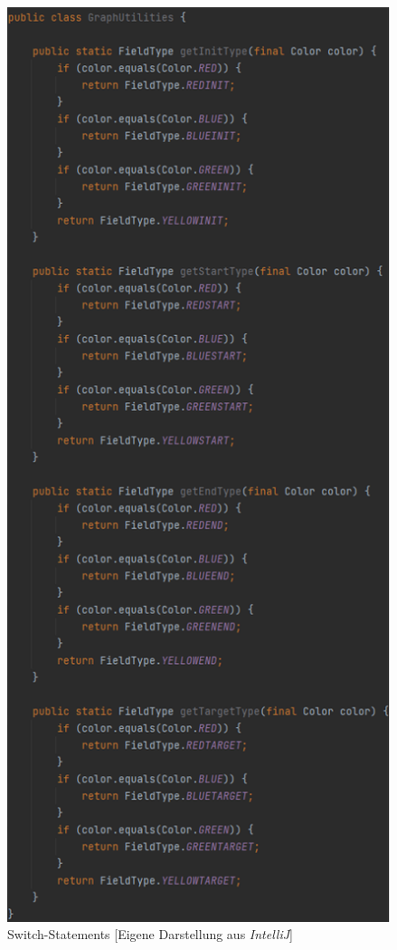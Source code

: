 \begin{figure}[htbp]
\centering
\centerline{\includegraphics[scale=.55]{graphutilities}}
\caption{Switch-Statements [Eigene Darstellung aus \emph{IntelliJ}]}
\label{fig:graphutilities}
\end{figure}

